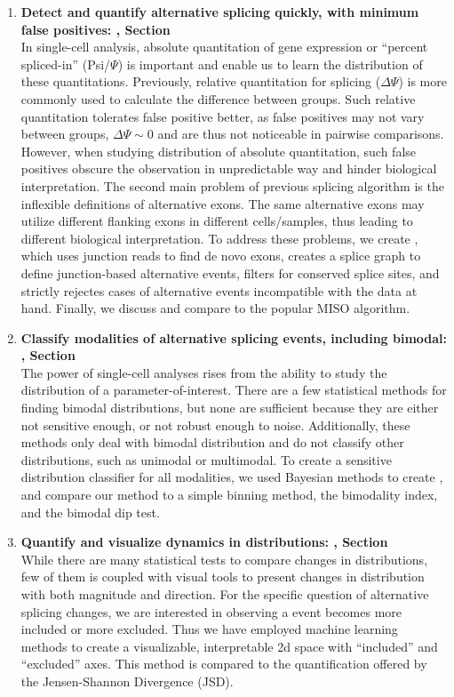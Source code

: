 \begin{enumerate}
	\item \textbf{Detect and quantify alternative splicing quickly, with minimum false positives: \outrigger, Section~}\\
	In single-cell analysis, absolute quantitation of gene expression or ``percent spliced-in'' (Psi/$\Psi$) is important and enable us to learn the distribution of these quantitations. Previously, relative quantitation for splicing ($\Delta\Psi$) is more commonly used to calculate the difference between groups. Such relative quantitation tolerates false positive better, as false positives may not vary between groups, $\Delta\Psi \sim 0$ and are thus not noticeable in pairwise comparisons. However, when studying distribution of absolute quantitation, such false positives obscure the observation in unpredictable way and hinder biological interpretation. The second main problem of previous splicing algorithm is the inflexible definitions of alternative exons. The same alternative exons may utilize different flanking exons in different cells/samples, thus leading to different biological interpretation. To address these problems, we create \outrigger, which uses junction reads to find de novo exons, creates a splice graph to define junction-based alternative events, filters for conserved splice sites, and strictly rejectes cases of alternative events incompatible with the data at hand. Finally, we discuss and compare to the popular MISO\cite{Katz:2010iv} algorithm.
	\item \textbf{Classify modalities of alternative splicing events, including bimodal: \anchor, Section~}\\
	The power of single-cell analyses rises from the ability to study the distribution of a parameter-of-interest. There are a few statistical methods for finding bimodal distributions, but none are sufficient because they are either not sensitive enough, or not robust enough to noise. Additionally, these methods only deal with bimodal distribution and do not classify other distributions, such as unimodal or multimodal. To create a sensitive distribution classifier for all modalities, we used Bayesian methods to create \anchor, and compare our method to a simple binning method, the bimodality index\cite{Wang:2009wm}, and the bimodal dip test\cite{Hartigan:1985ca}.
	\item \textbf{Quantify and visualize dynamics in distributions: \bonvoyage, Section~}\\
	While there are many statistical tests to compare changes in distributions, few of them is coupled with visual tools to present changes in distribution with both magnitude and direction. For the specific question of alternative splicing changes, we are interested in observing a event becomes more included or more excluded. Thus we have employed machine learning methods to create a visualizable, interpretable 2d space with ``included'' and ``excluded'' axes. This method is compared to the quantification offered by the Jensen-Shannon Divergence (JSD)\cite{Cover:2011vn}.
\end{enumerate}

